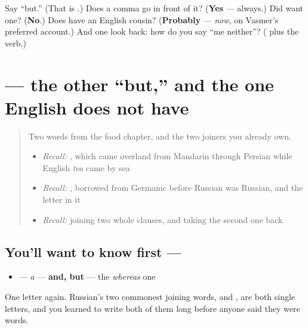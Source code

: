 \begin{tcolorbox}[breakable,colback=teal!4,colframe=teal!35!black,title={Before you move on}]
Say \textquotedblleft{}but.\textquotedblright{} (That is \textbf{}.) Does a comma go in front of it? (\textbf{Yes} — always.) Did \textbf{} want one? (\textbf{No}.) Does \textbf{} have an English cousin? (\textbf{Probably} — \emph{now}, on Vasmer's preferred account.) And one look back: how do you say \textquotedblleft{}me neither\textquotedblright{}? (\textbf{  } plus the verb.)
\end{tcolorbox}
\section[\texorpdfstring{\ru{а} (a)}{а (a)}]{ — the other \textquotedblleft{}but,\textquotedblright{} and the one English does not have}

\label{lesson:RU-C17-a}



\begin{quote}
Two words from the food chapter, and the two joiners you already own.

\begin{itemize}
\raggedright
  \item \emph{Recall:} \emph{}, which came overland from Mandarin through Persian while English \emph{tea} came by sea
  \item \emph{Recall:} \emph{}, borrowed from Germanic before Russian was Russian, and the letter \textbf{} in it
  \item \emph{Recall:} \emph{} joining two whole clauses, and \emph{} taking the second one back
\end{itemize}
\end{quote}

\subsection*{You'll want to know first — }
\begin{itemize}
\raggedright
  \item \textbf{} — \emph{a} — \textbf{and, but} — the \emph{whereas} one
\end{itemize}

One letter again. Russian's two commonest joining words, \textbf{} and \textbf{}, are both single letters, and you learned to write both of them long before anyone said they were words.

